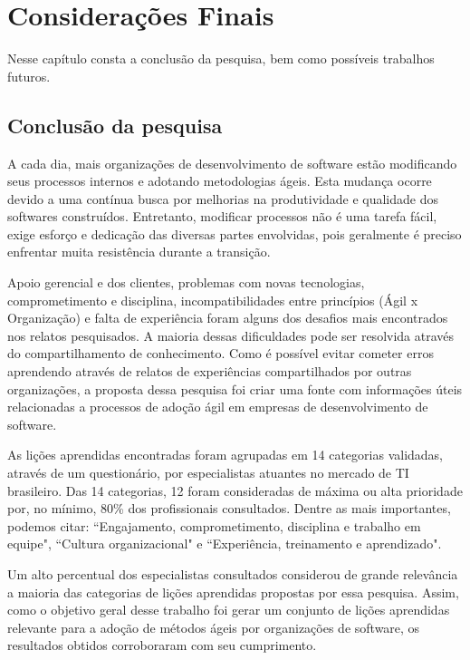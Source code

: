 \chapter{Considerações Finais}

Nesse capítulo consta a conclusão da pesquisa, bem como possíveis trabalhos futuros.

\section{Conclusão da pesquisa}

A cada dia, mais organizações de desenvolvimento de software estão modificando seus processos internos e adotando metodologias ágeis. Esta mudança ocorre devido a uma contínua busca por melhorias na produtividade e qualidade dos softwares construídos. Entretanto, modificar processos não é uma tarefa fácil, exige esforço e dedicação das diversas partes envolvidas, pois geralmente é preciso enfrentar muita resistência durante a transição.

Apoio gerencial e dos clientes, problemas com novas tecnologias, comprometimento e disciplina, incompatibilidades entre princípios (Ágil x Organização) e falta de experiência foram alguns dos desafios mais encontrados nos relatos pesquisados. A maioria dessas dificuldades pode ser resolvida através do compartilhamento de conhecimento. Como é possível evitar cometer erros aprendendo através de relatos de experiências compartilhados por outras organizações, a proposta dessa pesquisa foi criar uma fonte com informações úteis relacionadas a processos de adoção ágil em empresas de desenvolvimento de software.

As lições aprendidas encontradas foram agrupadas em 14 categorias validadas, através de um questionário, por especialistas atuantes no mercado de TI brasileiro. Das 14 categorias, 12 foram consideradas de máxima ou alta prioridade por, no mínimo, 80\% dos profissionais consultados. Dentre as mais importantes, podemos citar: ``Engajamento, comprometimento, disciplina e trabalho em equipe", ``Cultura organizacional" e ``Experiência, treinamento e aprendizado".

Um alto percentual dos especialistas consultados considerou de grande relevância a maioria das categorias de lições aprendidas propostas por essa pesquisa. Assim, como o objetivo geral desse trabalho foi gerar um conjunto de lições aprendidas relevante para a adoção de métodos ágeis por organizações de software, os resultados obtidos corroboraram com seu cumprimento.

